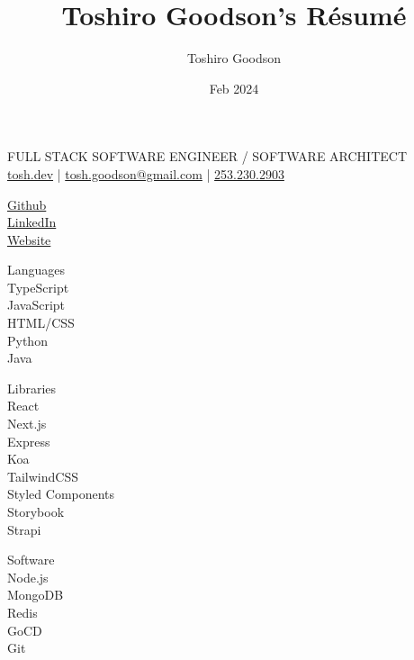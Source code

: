 \documentclass{resume}
\title{Toshiro Goodson's Résumé}
\author{Toshiro Goodson}
\date{Feb 2024}
\begin{document}
\color{content}
\begin{spacing}{1.2}
	\begin{paracol}{2}
		\switchcolumn
		\color{subcontent}
		\begin{spacing}{0.9}
			{\Huge {}}
		\end{spacing}
		FULL STACK SOFTWARE ENGINEER / SOFTWARE ARCHITECT\\
		\href{https://tosh.dev}{tosh.dev} | \href{mailto:tosh.goodson@gmail.com}{tosh.goodson@gmail.com} | \href{tel:2532302903}{253.230.2903}
	\end{paracol}

	\bigskip
	\bigskip
	\bigskip

	\begin{paracol}{2}
	
		\begin{flushright}
			\small {}

			\begin{spacing}{1.1}
				\href{https://github.com/toshgoodson/}{Github}\\
				\href{https://www.linkedin.com/in/toshgoodson/}{LinkedIn}\\
				\href{https://tosh.dev}{Website}

				\bigskip

				\small {}

				{\color{subcontent} \footnotesize Languages}\\
				\smallskip
				TypeScript\\
				JavaScript\\
				HTML/CSS\\
				Python\\
				Java

				\medskip

				{\color{subcontent} \footnotesize Libraries}\\
				\smallskip
				React\\
				Next.js\\
				Express\\
				Koa\\
				TailwindCSS\\
				Styled Components\\
				Storybook\\
				Strapi

				\medskip

				{\color{subcontent} \footnotesize Software}\\
				\smallskip
				Node.js\\
				MongoDB\\
				Redis\\
				GoCD\\
				Git


\end{spacing}
\end{flushright}
\end{paracol}
\end{spacing}
\end{document}
